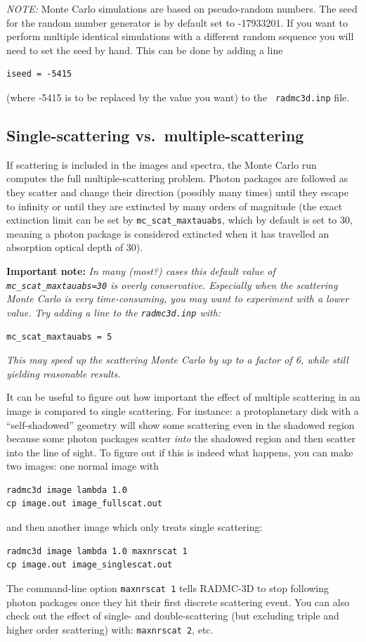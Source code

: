 \documentclass{report}
\begin{document}
{\em NOTE:} Monte Carlo simulations are based on pseudo-random numbers.
The seed for the random number generator is by default set to -17933201.
If you want to perform multiple identical simulations with a different
random sequence you will need to set the seed by hand. This can be
done by adding a line 
{\small\begin{verbatim}
iseed = -5415
\end{verbatim}}
(where -5415 is to be replaced by the value you want) to the {\small\tt
  radmc3d.inp} file.

\subsection{Single-scattering vs.~multiple-scattering}
\label{sec-single-multiple-scattering}
%
If scattering is included in the images and spectra, the Monte Carlo run
computes the full multiple-scattering problem. Photon packages are followed
as they scatter and change their direction (possibly many times) until they
escape to infinity or until they are extincted by many orders of magnitude
(the exact extinction limit can be set by {\small\tt mc\_scat\_maxtauabs},
which by default is set to 30, meaning a photon package is considered
extincted when it has travelled an absorption optical depth of 30).

{\bf Important note:} {\em In many (most?) cases this default value of
{\small\tt mc\_scat\_maxtauabs=30} is overly conservative. Especially
when the scattering Monte Carlo is very time-consuming, you may want
to experiment with a lower value. Try adding a line to the
{\small\tt radmc3d.inp} with:}
{\small\begin{verbatim}
mc_scat_maxtauabs = 5
\end{verbatim}}
{\em This may speed up the scattering Monte Carlo by up to a factor
of 6, while still yielding reasonable results.}

It can be useful to figure out how important the effect of
multiple scattering in an image is compared to single scattering. For
instance: a protoplanetary disk with a ``self-shadowed'' geometry will
show some scattering even in the shadowed region because some photon
packages scatter {\em into} the shadowed region and then scatter into
the line of sight. To figure out if this is indeed what happens, you
can make two images: one normal image with
{\small\begin{verbatim}
radmc3d image lambda 1.0
cp image.out image_fullscat.out
\end{verbatim}}
and then another image which only treats single scattering:
{\small\begin{verbatim}
radmc3d image lambda 1.0 maxnrscat 1
cp image.out image_singlescat.out
\end{verbatim}}
The command-line option {\small\tt maxnrscat 1} tells RADMC-3D to
stop following photon packages once they hit their first discrete
scattering event. You can also check out the effect of single- and
double-scattering (but excluding triple and higher order scattering)
with: {\small\tt maxnrscat 2}, etc.
\end{document}
